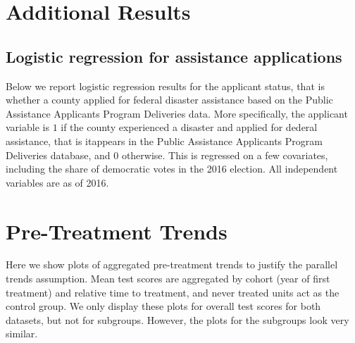 
\section{Additional Results} \label{AppendixA}

\subsection{Logistic regression for assistance applications}

Below we report logistic regression results for the applicant status, that is whether a county applied for federal disaster assistance based on the Public Assistance Applicants Program Deliveries data. More specifically, the applicant variable is $1$ if the county experienced a disaster and applied for dederal assistance, that is itappears in the Public Assistance Applicants Program Deliveries database, and $0$ otherwise. This is regressed on a few covariates, including the share of democratic votes in the 2016 election. All independent variables are as of 2016.




\section{Pre-Treatment Trends} \label{PreTrends}

Here we show plots of aggregated pre-treatment trends to justify the parallel trends assumption. Mean test scores are aggregated by cohort (year of first treatment) and relative time to treatment, and never treated units act as the control group. We only display these plots for overall test scores for both datasets, but not for subgroups. However, the plots for the subgroups look very similar.

